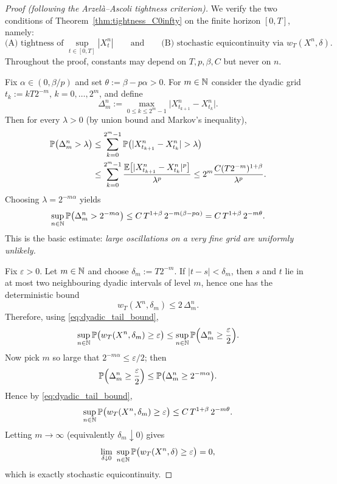 \begin{proof}[Proof (following the Arzel\`a--Ascoli tightness criterion)]
We verify the two conditions of Theorem~\ref{thm:tightness_C0infty} on the finite horizon $[0,T]$,
namely:
\[
\text{(A) tightness of }\sup_{t\in[0,T]}|X_t^n|
\qquad\text{and}\qquad
\text{(B) stochastic equicontinuity via }w_T(X^n,\delta).
\]
Throughout the proof, constants may depend on $T,p,\beta,C$ but never on $n$.

\medskip
\noindent{}
Fix $\alpha\in(0,\beta/p)$ and set $\theta:=\beta-p\alpha>0$.
For $m\in\mathbb{N}$ consider the dyadic grid $t_k:=kT2^{-m}$, $k=0,\dots,2^m$, and define
\[
\Delta_m^n:=\max_{0\le k\le 2^m-1}\bigl|X^n_{t_{k+1}}-X^n_{t_k}\bigr|.
\]
Then for every $\lambda>0$ (by union bound and Markov's inequality),
\begin{align*}
\Pp\bigl(\Delta_m^n>\lambda\bigr)
&\le \sum_{k=0}^{2^m-1} \Pp\bigl(|X^n_{t_{k+1}}-X^n_{t_k}|>\lambda\bigr)\\
&\le \sum_{k=0}^{2^m-1} \frac{\E\bigl[|X^n_{t_{k+1}}-X^n_{t_k}|^p\bigr]}{\lambda^p}
\le 2^m\frac{C (T2^{-m})^{1+\beta}}{\lambda^p}.
\end{align*}
Choosing $\lambda=2^{-m\alpha}$ yields
\begin{equation}\label{eq:dyadic_tail_bound}
\sup_{n\in\mathbb{N}}\mathbb{P}\bigl(\Delta_m^n>2^{-m\alpha}\bigr)
\le C\,T^{1+\beta}\,2^{-m(\beta-p\alpha)}
= C\,T^{1+\beta}\,2^{-m\theta}.
\end{equation}
This is the basic estimate: \emph{large oscillations on a very fine grid are uniformly unlikely.}

\medskip
\noindent{}
Fix $\varepsilon>0$.
Let $m\in\mathbb{N}$ and choose $\delta_m:=T2^{-m}$.
If $|t-s|<\delta_m$, then $s$ and $t$ lie in at most two neighbouring dyadic intervals of level $m$,
hence one has the deterministic bound
\begin{equation}\label{eq:modulus_vs_dyadic}
w_T(X^n,\delta_m)\le 2\,\Delta_m^n.
\end{equation}
Therefore, using \eqref{eq:dyadic_tail_bound},
\[
\sup_{n\in\mathbb{N}}\mathbb{P}\bigl(w_T(X^n,\delta_m)\ge\varepsilon\bigr)
\le \sup_{n\in\mathbb{N}}\mathbb{P}\Bigl(\Delta_m^n\ge \frac{\varepsilon}{2}\Bigr).
\]
Now pick $m$ so large that $2^{-m\alpha}\le \varepsilon/2$; then
\[
\mathbb{P}\Bigl(\Delta_m^n\ge \frac{\varepsilon}{2}\Bigr)
\le \mathbb{P}\bigl(\Delta_m^n\ge 2^{-m\alpha}\bigr).
\]
Hence by \eqref{eq:dyadic_tail_bound},
\[
\sup_{n\in\mathbb{N}}\mathbb{P}\bigl(w_T(X^n,\delta_m)\ge\varepsilon\bigr)
\le C\,T^{1+\beta}\,2^{-m\theta}.
\]
Letting $m\to\infty$ (equivalently $\delta_m\downarrow 0$) gives
\[
\lim_{\delta\downarrow 0}\ \sup_{n\in\N}\Pp\bigl(w_T(X^n,\delta)\ge\varepsilon\bigr)=0,
\]
which is exactly stochastic equicontinuity.


\end{proof}
